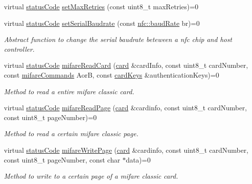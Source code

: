 \begin{DoxyCompactItemize}
virtual \hyperlink{declarations_8h_ae1d20c5a38cae82ccaa6a77be3fd264b}{status\+Code} \hyperlink{classnfc_1_1NFC_a9dd84363c873a5d00c7edce644706bc0}{set\+Max\+Retries} (const uint8\+\_\+t max\+Retries)=0
\item 
virtual \hyperlink{declarations_8h_ae1d20c5a38cae82ccaa6a77be3fd264b}{status\+Code} \hyperlink{classnfc_1_1NFC_a1657b79a7ca710e01cf053ab269949ba}{set\+Serial\+Baudrate} (const \hyperlink{declarations_8h_a18236cb00569a8f612f8957044868f74}{nfc\+::baud\+Rate} br)=0
\begin{DoxyCompactList}\small\item\em Abstract function to change the serial baudrate beteween a nfc chip and host controller. \end{DoxyCompactList}\item 
virtual \hyperlink{declarations_8h_ae1d20c5a38cae82ccaa6a77be3fd264b}{status\+Code} \hyperlink{classnfc_1_1NFC_af9089f7662b5c41791c1acac197dc843}{mifare\+Read\+Card} (\hyperlink{classcard}{card} \&card\+Info, const uint8\+\_\+t card\+Number, const \hyperlink{declarations_8h_a305b1a3bcfca65e2a82f0f9d24676835}{mifare\+Commands} AorB, const \hyperlink{structnfc_1_1cardKeys}{card\+Keys} \&authentication\+Keys)=0
\begin{DoxyCompactList}\small\item\em Method to read a entire mifare classic card. \end{DoxyCompactList}\item 
virtual \hyperlink{declarations_8h_ae1d20c5a38cae82ccaa6a77be3fd264b}{status\+Code} \hyperlink{classnfc_1_1NFC_adb0cc22d46e5a97d0b991891998578c6}{mifare\+Read\+Page} (\hyperlink{classcard}{card} \&cardinfo, const uint8\+\_\+t card\+Number, const uint8\+\_\+t page\+Number)=0
\begin{DoxyCompactList}\small\item\em Method to read a certain mifare classic page. \end{DoxyCompactList}\item 
virtual \hyperlink{declarations_8h_ae1d20c5a38cae82ccaa6a77be3fd264b}{status\+Code} \hyperlink{classnfc_1_1NFC_a5b2d7d0316f500f2bc69203eee7aa655}{mifare\+Write\+Page} (\hyperlink{classcard}{card} \&cardinfo, const uint8\+\_\+t card\+Number, const uint8\+\_\+t page\+Number, const char $\ast$data)=0
\begin{DoxyCompactList}\small\item\em Method to write to a certain page of a mifare classic card. \end{DoxyCompactList}\item 

\end{DoxyCompactItemize}
